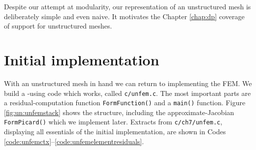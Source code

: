 
Despite our attempt at modularity, our representation of an unstructured mesh is deliberately simple and even naive.  It motivates the Chapter \ref{chap:dp} coverage of \PETSc support for unstructured meshes.


\section{Initial implementation}

With an unstructured mesh in hand we can return to implementing the FEM.  We build a \pSNES-using code which works, called \texttt{c/\CODELOC unfem.c}.  The most important parts are a residual-computation function \texttt{FormFunction()} and a \texttt{main()} function.  Figure \ref{fig:un:unfemstack} shows the structure, including the approximate-Jacobian \texttt{FormPicard()} which we implement later.  Extracts from \texttt{c/ch7/unfem.c}, displaying all essentials of the initial implementation, are shown in Codes \ref{code:unfemctx}--\ref{code:unfemelementresiduals}.

